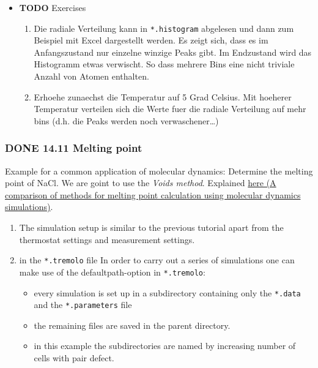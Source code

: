 \documentclass[11pt]{article}
\begin{document}
\begin{itemize}

\item \textbf{TODO} Exercises\\
\label{sec-2.4.10.1}

\begin{enumerate}
\item Die radiale Verteilung kann in \texttt{*.histogram} abgelesen und dann zum Beispiel mit Excel dargestellt werden. Es zeigt sich, dass es im Anfangszustand nur einzelne winzige Peaks gibt. Im Endzustand wird das Histogramm etwas verwischt. So dass mehrere Bins eine nicht triviale Anzahl von Atomen enthalten.
\item Erhoehe zunaechst die Temperatur auf 5 Grad Celsius. Mit hoeherer Temperatur verteilen sich die Werte fuer die radiale Verteilung auf mehr bins (d.h. die Peaks werden noch verwaschener\ldots{})
\end{enumerate}
\end{itemize} %
\subsubsection{\textbf{DONE} 14.11 Melting point}
\label{sec-2.4.11}


Example for a common application of molecular dynamics: Determine the melting point of NaCl.
We are goint to use the \emph{Voids method}. Explained \href{http://scitation.aip.org/docserver/fulltext/aip/journal/jcp/136/14/1.3702587.pdf%3Fexpires%3D1389619185&id%3Did&accname%3D375729&checksum%3D95953424103DE090EC600A7A00E8088C}{here (A comparison of methods for melting point calculation using molecular dynamics simulations)}. 

\begin{enumerate}
\item The simulation setup is similar to the previous tutorial apart from the thermostat settings and measurement settings.
\item in the \texttt{*.tremolo} file
   In order to carry out a series of simulations one can make use of the defaultpath-option in \texttt{*.tremolo}:

\begin{itemize}
\item every simulation is set up in a subdirectory containing only the \texttt{*.data} and the \texttt{*.parameters} file
\item the remaining files are saved in the parent directory.
\item in this example the subdirectories are named by increasing number of cells with pair defect.
\end{itemize}

\end{enumerate}
\end{document}
